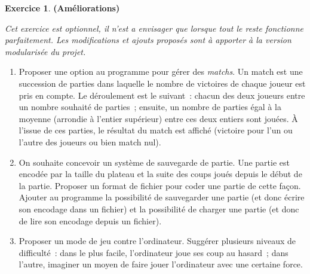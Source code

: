\documentclass[12pt]{article}
\theoremstyle{definition}
\newtheorem{Exercice}{Exercice}
\begin{document}
\begin{Exercice} {\bf (Améliorations)}\smallskip

{\it Cet exercice est optionnel, il n'est a envisager que lorsque
tout le reste fonctionne parfaitement. Les modifications et ajouts
proposés sont à apporter à la version modularisée du projet.}
\smallskip

\begin{enumerate}
    \item Proposer une option au programme pour gérer des {\em matchs}.
    Un match est une succession de parties dans laquelle le nombre
    de victoires de chaque joueur est pris en compte. Le déroulement est
    le suivant~: chacun des deux joueurs entre un nombre souhaité de
    parties~; ensuite, un nombre de parties égal à la moyenne (arrondie
    à l'entier supérieur) entre ces deux entiers sont jouées.
    À l'issue de ces parties, le résultat du match est affiché
    (victoire pour l'un ou l'autre des joueurs ou bien match nul).
    \smallskip

    \item On souhaite concevoir un système de sauvegarde de partie. Une
    partie est encodée par la taille du plateau et la suite des coups
    joués depuis le début de la partie. Proposer un format de fichier pour
    coder une partie de cette façon. Ajouter au programme la possibilité
    de sauvegarder une partie (et donc écrire son encodage dans un fichier)
    et la possibilité de charger une partie (et donc de lire son
    encodage depuis un fichier).
    \smallskip

    \item Proposer un mode de jeu contre l'ordinateur. Suggérer plusieurs
    niveaux de difficulté~: dans le plus facile, l'ordinateur joue
    ses coup au hasard~; dans l'autre, imaginer un moyen de faire jouer
    l'ordinateur avec une certaine force.
\end{enumerate}
\end{Exercice}
\bigskip
\end{document}
